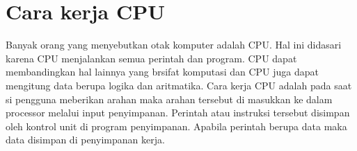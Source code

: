 \section{Cara kerja CPU}
Banyak orang yang menyebutkan otak komputer adalah CPU. Hal ini didasari karena CPU menjalankan semua perintah dan program. CPU dapat membandingkan hal lainnya yang brsifat komputasi dan CPU juga dapat mengitung data berupa logika dan aritmatika. Cara kerja CPU adalah pada saat si pengguna meberikan arahan maka arahan tersebut di masukkan ke dalam processor melalui input penyimpanan. Perintah atau instruksi tersebut disimpan oleh kontrol unit di program penyimpanan. Apabila perintah berupa data maka data disimpan di penyimpanan kerja. 